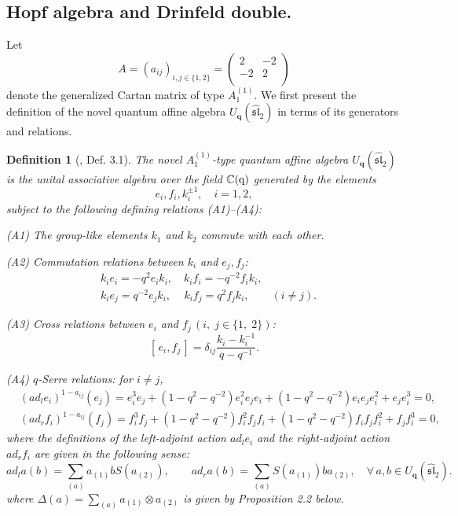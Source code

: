 \documentclass[12pt]{amsart}
\newtheorem{defi}[theorem]{Definition}
\numberwithin{equation}{section}
\numberwithin{equation}{section}
\begin{document}
\subsection{Hopf algebra and Drinfeld double.}
Let 
\begin{equation}
A=(a_{ij})_{i,j\in\{1,2\}}=\left(\begin{array}{rr}2&-2\\-2&2\\\end{array}\right)
\end{equation}
denote the generalized Cartan matrix of type \(A^{(1)}_1\). We first present the definition of the novel quantum affine algebra \(U_{\textbf{q}}(\widehat{\mathfrak{sl}}_2)\) in terms of its generators and relations.
\begin{defi} [\cite{HZhuang}, Def. 3.1]
The novel \(A^{(1)}_1\)-type quantum affine algebra \(U_{\textbf{q}}(\widehat{\mathfrak{sl}}_2)\) is the unital associative algebra over the field 
\(\mathbb{C}(\rm q)\) generated by the elements 
\begin{equation}
e_i, f_{i},k^{\pm1}_{i},\quad i=1,2,
\end{equation}
subject to the following defining relations (A1)–(A4):

(A1) The group-like elements \(k_{1}\)
and \(k_{2}\) commute with each other. 

(A2)  Commutation relations between \(k_{i}\)
and \(e_j, f_{j}\):
\begin{align*}
&k_ie_i=-q^2e_ik_i, \quad k_if_i=-q^{-2}f_ik_i,\\
&k_ie_j=q^{-2}e_jk_i, \quad \,k_if_j=q^2f_jk_i, \qquad (i\ne j).
\end{align*}

(A3) Cross relations between \(e_i\) and 
\(f_j\,(i,\;j\in\{1,\;2\})\):
\[[\,e_i,f_j\,]=\delta_{ij}\frac{k_i-k^{-1}_i}{q-q^{-1}}.\]

(A4) \(q\)-Serre relations: for \(i\neq j\),  
\begin{align*}
&(ad_l e_i)^{1-a_{ij}}(e_j)=e_i^3e_j+(1-q^2-q^{-2})e_i^2e_je_i+(1-q^2-q^{-2})e_ie_je_i^2+e_je_i^3=0,\\
&(ad_r f_i)^{1-a_{ij}}(f_j)=f_i^3f_j+(1-q^2-q^{-2})f_i^2f_jf_i+(1-q^2-q^{-2})f_if_jf_i^2+f_jf_i^3=0,
\end{align*}
where the definitions of the left-adjoint action \(ad_l e_i\) and the right-adjoint action
\(ad_r f_i\) are given in the following sense:
\[ad_l a(b)=\sum\limits_{(a)}a_{(1)}bS(a_{(2)}),\qquad ad_r a(b)=\sum\limits_{(a)}S(a_{(1)})ba_{(2)},\quad \forall\, a,b\in U_{\bm q}(\widehat{\mathfrak{sl}}_2).\]
where \(\Delta(a)=\sum\limits_{(a)}a_{(1)}\otimes a_{(2)}\) is given by Proposition 2.2 below.
\end{defi}
\end{document}
